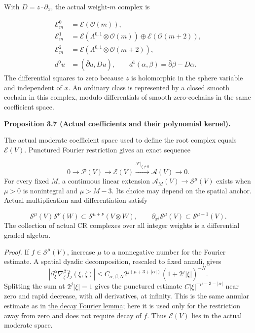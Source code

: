 \documentclass[
  english,
  11pt,
  reqno]{amsart}
\makeatletter
\newcommand{\pandocstatementheading}[1]{%
  \par\addpenalty{\@beginparpenalty}%
  \addvspace{.5\baselineskip plus .2\baselineskip minus .2\baselineskip}%
  {\normalfont\bfseries #1\par}%
  \nobreak\@afterindenttrue\@afterheading
}
\makeatother
\begin{document}
With \(D=z\cdot\partial_x\), the actual weight-\(m\) complex is

\label{eq:online-actual-cr-complex} \[
\begin{aligned}
\mathscr E_m^0&=\mathscr E(\mathcal O(m)),\\
\mathscr E_m^1&=\mathscr E(\Lambda^{0,1}\otimes\mathcal O(m))
 \oplus\mathscr E(\mathcal O(m+2)),\\
\mathscr E_m^2&=\mathscr E(\Lambda^{0,1}\otimes\mathcal O(m+2)),\\
d^0u&=(\bar\partial u,Du),\qquad
d^1(\alpha,\beta)=\bar\partial\beta-D\alpha.
\end{aligned}
\] The differential squares to zero because \(z\) is holomorphic in the
sphere variable and independent of \(x\). An ordinary class is
represented by a closed smooth cochain in this complex, modulo
differentials of smooth zero-cochains in the same coefficient space.

\pandocstatementheading{\leavevmode{}\label{prop:online-actual-coefficient-exact-sequence}Proposition 3.7 (Actual coefficients and their polynomial kernel).}

The actual moderate coefficient space used to define the root complex
equals \(\mathscr E(V)\). Punctured Fourier restriction gives an exact
sequence

\label{eq:online-actual-symbol-exact-sequence} \[
0\longrightarrow\mathscr P(V)
\longrightarrow\mathscr E(V)
\xrightarrow{\mathcal F|_{\xi\ne0}}\mathscr A(V)
\longrightarrow0.
\] For every fixed \(M\), a continuous linear extension
\(\mathscr A_M(V)\to\mathscr S^\mu(V)\) exists when \(\mu>0\) is
nonintegral and \(\mu>M-3\). Its choice may depend on the spatial
anchor. Actual multiplication and differentiation satisfy

\label{eq:online-actual-symbol-algebra} \[
\mathscr S^\mu(V)\mathscr S^\nu(W)
\subset\mathscr S^{\mu+\nu}(V\otimes W),
\qquad
\partial_{x^i}\mathscr S^\mu(V)\subset\mathscr S^{\mu-1}(V).
\] The collection of actual CR complexes over all integer weights is a
differential graded algebra.

\emph{Proof.} If \(f\in\mathscr S^\mu(V)\), increase \(\mu\) to a
nonnegative number for the Fourier estimate. A spatial dyadic
decomposition, rescaled to fixed annuli, gives \[
\left|\partial_\xi^\alpha\nabla_\zeta^\beta\widehat f_j(\xi,\zeta)\right|
\le C_{\alpha,\beta,N}
2^{j(\mu+3+|\alpha|)}(1+2^j|\xi|)^{-N}.
\] Splitting the sum at \(2^j|\xi|=1\) gives the punctured estimate
\(C|\xi|^{-\mu-3-|\alpha|}\) near zero and rapid decrease, with all
derivatives, at infinity. This is the same annular estimate as in
\hyperref[lem:online-decay-fourier-isomorphism]{the decay Fourier
lemma}; here it is used only for the restriction away from zero and does
not require decay of \(f\). Thus \(\mathscr E(V)\) lies in the actual
moderate space.
\end{document}
